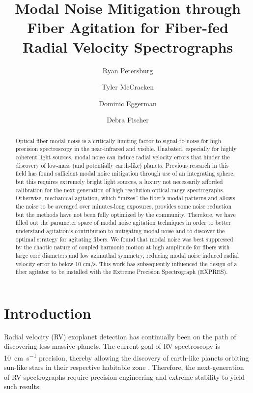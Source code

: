 \documentclass[twocolumn]{emulateapj}
\begin{document}
\title{Modal Noise Mitigation through Fiber Agitation for Fiber-fed Radial Velocity Spectrographs}

\author{Ryan Petersburg}

\author{Tyler McCracken}

\author{Dominic Eggerman}

\author{Debra Fischer}


\begin{abstract}

Optical fiber modal noise is a critically limiting factor to signal-to-noise for high precision spectroscopy in the near-infrared and visible. Unabated, especially for highly coherent light sources, modal noise can induce radial velocity errors that hinder the discovery of low-mass (and potentially earth-like) planets. Previous research in this field has found sufficient modal noise mitigation through use of an integrating sphere, but this requires extremely bright light sources, a luxury not necessarily afforded calibration for the next generation of high resolution optical-range spectrographs. Otherwise, mechanical agitation, which ``mixes'' the fiber's modal patterns and allows the noise to be averaged over minutes-long exposures, provides some noise reduction but the methods have not been fully optimized by the community. Therefore, we have filled out the parameter space of modal noise agitation techniques in order to better understand agitation's contribution to mitigating modal noise and to discover the optimal strategy for agitating fibers. We found that modal noise was best suppressed by the chaotic nature of coupled harmonic motion at high amplitude for fibers with large core diameters and low azimuthal symmetry, reducing modal noise induced radial velocity error to below 10 cm/s. This work has subsequently influenced the design of a fiber agitator to be installed with the Extreme Precision Spectrograph (EXPRES).

\end{abstract}


\section{Introduction}
\label{sec:intro}

Radial velocity (RV) exoplanet detection has continually been on the path of discovering less massive planets. The current goal of RV spectroscopy is \SI{10}{\centi\meter\per\second} precision, thereby allowing the discovery of earth-like planets orbiting sun-like stars in their respective habitable zone \citep{Fischer2016}. Therefore, the next-generation of RV spectrographs require precision engineering and extreme stability to yield such results.
\end{document}
